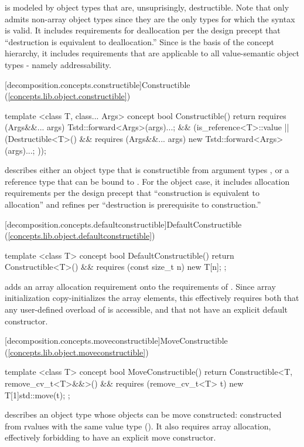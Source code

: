  is modeled by object types that are, unsuprisingly, destructible.  Note
that  only admits non-array object types since they are the only types for which
the syntax  is valid. It includes requirements for deallocation per the design
precept that ``destruction is equivalent to deallocation.'' Since  is the basis
of the concept hierarchy, it includes requirements that are applicable to all value-semantic
object types - namely addressability.

[decomposition.concepts.constructible]{Constructible (\ref{concepts.lib.object.constructible})}
\begin{codeblock}
template <class T, class... Args>
concept bool Constructible() {
  return requires (Args&&... args) {
    T{std::forward<Args>(args)...};
  } &&
  (is_reference<T>::value ||
    (Destructible<T>() && requires (Args&&... args) {
      new T{std::forward<Args>(args)...};
    }));
}
\end{codeblock}

 describes either an object type  that is constructible from argument types
, or a reference type  that can be bound to . For the object case,
it includes allocation requirements per the design precept that ``construction is equivalent to allocation''
and refines  per ``destruction is prerequisite to construction.''

[decomposition.concepts.defaultconstructible]{DefaultConstructible (\ref{concepts.lib.object.defaultconstructible})}
\begin{codeblock}
template <class T>
concept bool DefaultConstructible() {
  return Constructible<T>() &&
    requires (const size_t n) {
      new T[n]{};
    };
}
\end{codeblock}

 adds an array allocation requirement onto the requirements of
. Since array initialization copy-initializes the array elements,
this effectively requires both that any user-defined overload of  is
accessible, and that  not have an explicit default constructor.

[decomposition.concepts.moveconstructible]{MoveConstructible (\ref{concepts.lib.object.moveconstructible})}
\begin{codeblock}
template <class T>
concept bool MoveConstructible() {
  return Constructible<T, remove_cv_t<T>&&>() &&
    requires (remove_cv_t<T> t) {
      new T[1]{std::move(t)};
    };
}
\end{codeblock}
 describes an object type  whose objects can be move constructed:
constructed from rvalues with the same value type (). It also requires array
allocation, effectively forbidding  to have an explicit move constructor.

